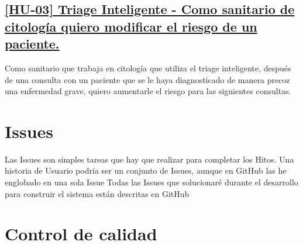 \subsection*{\href{https://github.com/RubenDelgadoPareja/TFG-Triage-Inteligente-Consulta-Medica/issues/5}{[HU-03] Triage Inteligente - Como sanitario de citología quiero modificar el riesgo de un paciente.}}
Como sanitario que trabaja en citología que utiliza el triage inteligente, después de una consulta con un paciente que se le haya diagnosticado de manera precoz una enfermedad grave,
quiero aumentarle el riesgo para las siguientes consultas.

\section{Issues}
Las Issues son simples tareas que hay que realizar para completar los Hitos.
Una historia de Usuario podría ser un conjunto de Issues, aunque en GitHub las he englobado en una sola Issue
Todas las Issues que solucionaré durante el desarrollo para construir el sistema están descritas en GitHub


\section{Control de calidad}

